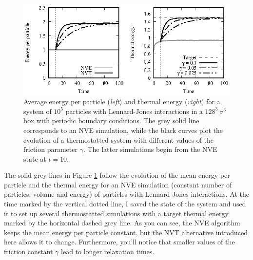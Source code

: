 \begin{figure}
  \begin{center}
    \includegraphics[width = \textwidth]{figures/Langevin.eps}
  \end{center}
  \caption{\label{Langevin}Average energy per particle (\textit{left}) and 
           thermal energy (\textit{right}) for a system of $10^5$ particles
           with Lennard-Jones interactions in a $128^3\ \sigma^3$ box with
           periodic boundary conditions. The grey solid line corresponds to an 
           NVE simulation, while the black curves plot the evolution of a 
           thermostatted system with different values of the friction parameter 
           $\gamma$. The latter simulations begin from the NVE state at
           $t = 10$.}
\end{figure}

The solid grey lines in Figure \ref{Langevin} follow the evolution of the mean 
energy per particle and the thermal energy for an NVE simulation (constant 
number of particles, volume and energy) of particles with Lennard-Jones 
interactions. At the time marked by the vertical dotted line, I saved the state 
of the system and used it to set up several thermostatted simulations with a 
target thermal energy marked by the horizontal dashed grey line. As you can see, 
the NVE algorithm keeps the mean energy per particle constant, but the NVT 
alternative introduced here allows it to change. Furthermore, you'll notice that 
smaller values of the friction constant $\gamma$ lead to longer relaxation 
times.


